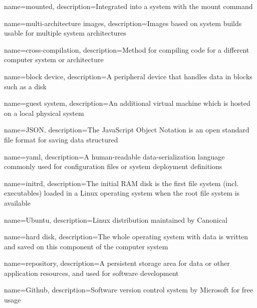 {
    name={mounted},
    description={Integrated into a system with the mount command}
}

{
    name={multi-architecture images},
    description={Images based on system builds usable for multiple system architectures}
}

{
    name={cross-compilation},
    description={Method for compiling code for a different computer system or architecture}
}

{
    name={block device},
    description={A peripheral device that handles data in blocks such as a disk}
}

{
    name={guest system},
    description={An additional virtual machine which is hosted on a local physical system}
}

{
    name={JSON},
    description={The JavaScript Object Notation is an open standard file format for saving data structured}
}

{
    name={yaml},
    description={A human-readable data-serialization language commonly used for configuration files or system deployment definitions}
}

{
    name={initrd},
    description={The initial RAM disk is the first file system (incl. executables) loaded in a Linux operating system when the root file system is available}
}

{
    name={Ubuntu},
    description={Linux distribution maintained by Canonical}
}

{
    name={hard disk},
    description={The whole operating system with data is written and saved on this component of the computer system}
}

{
    name={repository},
    description={A persistent storage area for data or other application resources, and used for software development}
}

{
    name={Github},
    description={Software version control system by Microsoft for free usage}
}

\glsaddall
